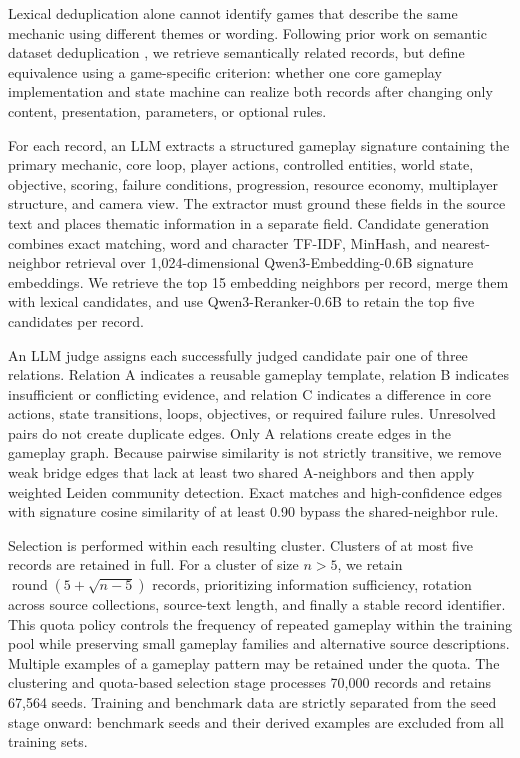 \documentclass{article}
\begin{document}
Lexical deduplication alone cannot identify games that describe the same mechanic using different themes or wording. Following prior work on semantic dataset deduplication \cite{abbas2023semdedup,tirumala2023d4}, we retrieve semantically related records, but define equivalence using a game-specific criterion: whether one core gameplay implementation and state machine can realize both records after changing only content, presentation, parameters, or optional rules.

For each record, an LLM extracts a structured gameplay signature containing the primary mechanic, core loop, player actions, controlled entities, world state, objective, scoring, failure conditions, progression, resource economy, multiplayer structure, and camera view. The extractor must ground these fields in the source text and places thematic information in a separate field. Candidate generation combines exact matching, word and character TF-IDF, MinHash, and nearest-neighbor retrieval over 1{,}024-dimensional Qwen3-Embedding-0.6B signature embeddings. We retrieve the top 15 embedding neighbors per record, merge them with lexical candidates, and use Qwen3-Reranker-0.6B to retain the top five candidates per record.

An LLM judge assigns each successfully judged candidate pair one of three relations. Relation A indicates a reusable gameplay template, relation B indicates insufficient or conflicting evidence, and relation C indicates a difference in core actions, state transitions, loops, objectives, or required failure rules. Unresolved pairs do not create duplicate edges. Only A relations create edges in the gameplay graph. Because pairwise similarity is not strictly transitive, we remove weak bridge edges that lack at least two shared A-neighbors and then apply weighted Leiden community detection. Exact matches and high-confidence edges with signature cosine similarity of at least 0.90 bypass the shared-neighbor rule.

Selection is performed within each resulting cluster. Clusters of at most five records are retained in full. For a cluster of size $n>5$, we retain $\operatorname{round}(5+\sqrt{n-5})$ records, prioritizing information sufficiency, rotation across source collections, source-text length, and finally a stable record identifier. This quota policy controls the frequency of repeated gameplay within the training pool while preserving small gameplay families and alternative source descriptions. Multiple examples of a gameplay pattern may be retained under the quota. The clustering and quota-based selection stage processes 70{,}000 records and retains 67{,}564 seeds. Training and benchmark data are strictly separated from the seed stage onward: benchmark seeds and their derived examples are excluded from all training sets.
\end{document}
